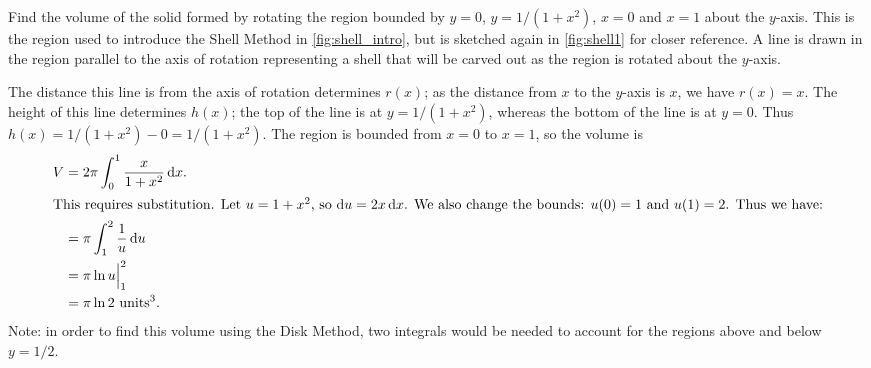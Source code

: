 \begin{example}\label{ex_shell1}%
Find the volume of the solid formed by rotating the region bounded by $y=0$, $y=1/(1+x^2)$, $x=0$ and $x=1$ about the $y$-axis.
%
%
\solution
This is the region used to introduce the Shell Method in \autoref{fig:shell_intro}, but is sketched again in \autoref{fig:shell1} for closer reference. A line is drawn in the region parallel to the axis of rotation representing a shell that will be carved out as the region is rotated about the $y$-axis.

The distance this line is from the axis of rotation determines $r(x)$; as the distance from $x$ to the $y$-axis is $x$, we have $r(x)=x$. The height of this line determines $h(x)$; the top of the line is at $y=1/(1+x^2)$, whereas the bottom of the line is at $y=0$. Thus $h(x) = 1/(1+x^2)-0 = 1/(1+x^2)$. The region is bounded from $x=0$ to $x=1$, so the volume is 
\begin{align*}
	V
	&= 2\pi\int_0^1 \frac{x}{1+x^2}\dd x.\\
\intertext{This requires substitution. Let \intertextmath{u=1+x^2}, so \intertextmath{\dd u = 2x\dd x}. We also change the bounds: \intertextmath{u(0) = 1} and \intertextmath{u(1) = 2}. Thus we have:}
	&= \pi\int_1^2 \frac{1}{u}\dd u \\
	&= \pi\ln u\Big|_1^2\\
	&= \pi\ln 2 %
	\ \text{units}^3.
\end{align*}
Note: in order to find this volume using the Disk Method, two integrals would be needed to account for the regions above and below $y=1/2$.
\end{example}

